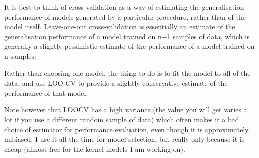 It is best to think of cross-validation as a way of estimating the generalisation performance of models generated by a particular procedure, rather than of the model itself. Leave-one-out cross-validation is essentially an estimate of the generalisation performance of a model trained on n−1 samples of data, which is generally a slightly pessimistic estimate of the performance of a model trained on n samples.

Rather than choosing one model, the thing to do is to fit the model to all of the data, and use LOO-CV to provide a slightly conservative estimate of the performance of that model.

Note however that LOOCV has a high variance (the value you will get varies a lot if you use a different random sample of data) which often makes it a bad choice of estimator for performance evaluation, even though it is approximately unbiased. I use it all the time for model selection, but really only because it is cheap (almost free for the kernel models I am working on).
